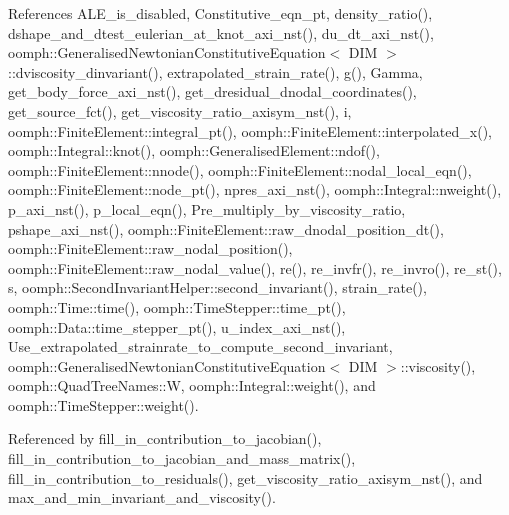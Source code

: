 References A\+L\+E\+\_\+is\+\_\+disabled, Constitutive\+\_\+eqn\+\_\+pt, density\+\_\+ratio(), dshape\+\_\+and\+\_\+dtest\+\_\+eulerian\+\_\+at\+\_\+knot\+\_\+axi\+\_\+nst(), du\+\_\+dt\+\_\+axi\+\_\+nst(), oomph\+::\+Generalised\+Newtonian\+Constitutive\+Equation$<$ D\+I\+M $>$\+::dviscosity\+\_\+dinvariant(), extrapolated\+\_\+strain\+\_\+rate(), g(), Gamma, get\+\_\+body\+\_\+force\+\_\+axi\+\_\+nst(), get\+\_\+dresidual\+\_\+dnodal\+\_\+coordinates(), get\+\_\+source\+\_\+fct(), get\+\_\+viscosity\+\_\+ratio\+\_\+axisym\+\_\+nst(), i, oomph\+::\+Finite\+Element\+::integral\+\_\+pt(), oomph\+::\+Finite\+Element\+::interpolated\+\_\+x(), oomph\+::\+Integral\+::knot(), oomph\+::\+Generalised\+Element\+::ndof(), oomph\+::\+Finite\+Element\+::nnode(), oomph\+::\+Finite\+Element\+::nodal\+\_\+local\+\_\+eqn(), oomph\+::\+Finite\+Element\+::node\+\_\+pt(), npres\+\_\+axi\+\_\+nst(), oomph\+::\+Integral\+::nweight(), p\+\_\+axi\+\_\+nst(), p\+\_\+local\+\_\+eqn(), Pre\+\_\+multiply\+\_\+by\+\_\+viscosity\+\_\+ratio, pshape\+\_\+axi\+\_\+nst(), oomph\+::\+Finite\+Element\+::raw\+\_\+dnodal\+\_\+position\+\_\+dt(), oomph\+::\+Finite\+Element\+::raw\+\_\+nodal\+\_\+position(), oomph\+::\+Finite\+Element\+::raw\+\_\+nodal\+\_\+value(), re(), re\+\_\+invfr(), re\+\_\+invro(), re\+\_\+st(), s, oomph\+::\+Second\+Invariant\+Helper\+::second\+\_\+invariant(), strain\+\_\+rate(), oomph\+::\+Time\+::time(), oomph\+::\+Time\+Stepper\+::time\+\_\+pt(), oomph\+::\+Data\+::time\+\_\+stepper\+\_\+pt(), u\+\_\+index\+\_\+axi\+\_\+nst(), Use\+\_\+extrapolated\+\_\+strainrate\+\_\+to\+\_\+compute\+\_\+second\+\_\+invariant, oomph\+::\+Generalised\+Newtonian\+Constitutive\+Equation$<$ D\+I\+M $>$\+::viscosity(), oomph\+::\+Quad\+Tree\+Names\+::W, oomph\+::\+Integral\+::weight(), and oomph\+::\+Time\+Stepper\+::weight().



Referenced by fill\+\_\+in\+\_\+contribution\+\_\+to\+\_\+jacobian(), fill\+\_\+in\+\_\+contribution\+\_\+to\+\_\+jacobian\+\_\+and\+\_\+mass\+\_\+matrix(), fill\+\_\+in\+\_\+contribution\+\_\+to\+\_\+residuals(), get\+\_\+viscosity\+\_\+ratio\+\_\+axisym\+\_\+nst(), and max\+\_\+and\+\_\+min\+\_\+invariant\+\_\+and\+\_\+viscosity().

\mbox{\label{classoomph_1_1GeneralisedNewtonianAxisymmetricNavierStokesEquations_af13a37d01a345265f81cf8a3453bfef9}} 
